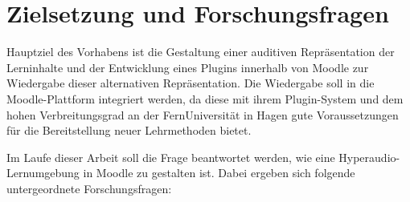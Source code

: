 %
%
%


\section{Zielsetzung und Forschungsfragen}
\label{sec:zielsetzung}
Hauptziel des Vorhabens ist die Gestaltung einer auditiven Repräsentation der Lerninhalte und der Entwicklung eines Plugins innerhalb von Moodle zur Wiedergabe dieser alternativen Repräsentation. Die Wiedergabe soll in die Moodle-Plattform integriert werden, da diese mit ihrem Plugin-System und dem hohen Verbreitungsgrad an der FernUniversität in Hagen gute Voraussetzungen für die Bereitstellung neuer Lehrmethoden bietet.

Im Laufe dieser Arbeit soll die Frage beantwortet werden, wie eine Hyperaudio-Lernumgebung in Moodle zu gestalten ist. Dabei ergeben sich folgende untergeordnete Forschungsfragen:

